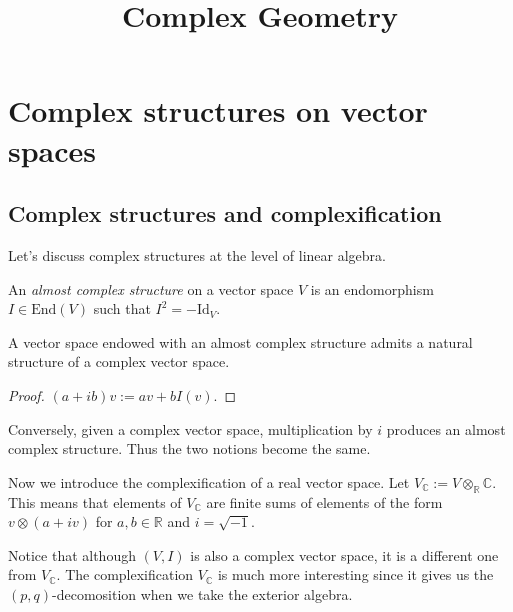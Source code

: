 



\title{Complex Geometry}
\maketitle

\label{section-phantom}

\tableofcontents

\section{Complex structures on vector spaces}
\label{section-complex-structure}

\subsection{Complex structures and
complexification}
\label{subsection-complexification}

\noindent
Let's discuss complex structures at the level
of linear algebra.

\begin{definition}
\label{definition-compl-struc-vecto-space}
An {\it almost complex structure} on a vector
space $V$
is an endomorphism $I \in \text{End}(V)$ such
that $I^2 = -\text{Id}_V$.
\end{definition}

\begin{lemma}
\label{lemma-almos-compl-struc-then-compl}
A vector space endowed with an almost complex
structure
admits a natural structure of a complex
vector space.
\end{lemma}

\begin{proof}
$(a+ib)v:=av + b I(v)$.
\end{proof}

\noindent
Conversely, given a complex vector space,
multiplication by $i$ produces an almost
complex structure.
Thus the two notions become the same.

\medskip\noindent
Now we introduce the complexification of a
real vector space.
Let $V_{\mathbb{C}}:=V
\otimes_{\mathbb{R}}\mathbb{C}$.
This means that elements of $V_{\mathbb{C}}$
are finite sums of elements of the form $v
\otimes (a+iv)$
for $a,b \in \mathbb{R}$ and $i = \sqrt{-1}$.

Notice that although $(V,I)$ is also a
complex vector space,
it is a different one from $V_\mathbb{C}$.
The complexification $V_\mathbb{C}$
is much more interesting since it gives us
the $(p,q)$-decomosition
when we take the exterior algebra.

